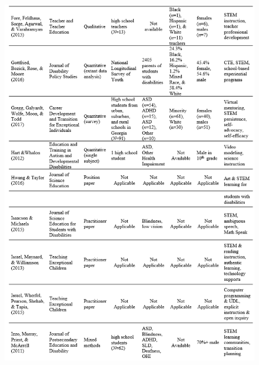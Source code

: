 \documentclass[11pt]{sig-alternate}
\begin{document}
\begin{large}
\begin{figure}[htp]
    \includegraphics[width=14cm]{Table1b.png}
\end{figure}
\newpage
\newpage
\pagebreak
\clearpage
\begin{figure}[htp]


\end{figure}
\end{large}
\end{document}
